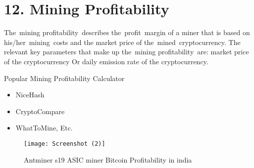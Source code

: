 \section*{12. Mining Profitability }
The mining profitability describes the profit margin of a miner that is based on his/her mining costs and the market price of the mined cryptocurrency. The relevant key parameters that make up the mining profitability are: market price of the cryptocurrency Or daily emission rate of the cryptocurrency.\vspace{.5cm}

Popular Mining Profitability Calculator
\begin{itemize}
	\item NiceHash
	\item CryptoCompare
	\item WhatToMine, Etc.
\end{itemize}

\begin{figure}[h]
	\centering
	\texttt{[image: Screenshot (2)]}
	\captionsetup{labelformat=empty}
	\caption{Antminer s19 ASIC miner Bitcoin Profitability in india}
\end{figure}